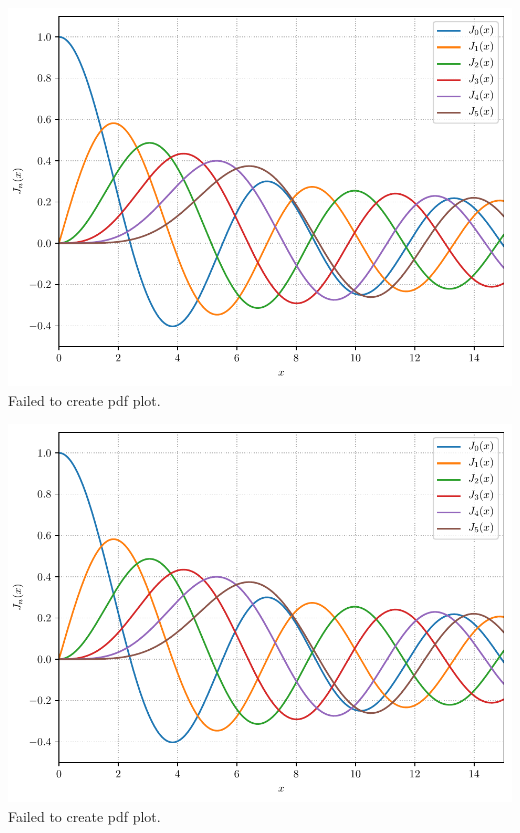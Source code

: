 \documentclass[12pt]{pylatex}
\begin{document}
\begin{minipage}{\textwidth}
   \centering
   {\includegraphics[width=6.4in]
      {example-04-fig.pdf}}{Failed to create pdf plot.}
\end{minipage}

\vfill

\begin{latex}
   {\includegraphics[width=6.4in]
      {example-04-fig.pdf}}{Failed to create pdf plot.}
\end{latex}
\end{document}
